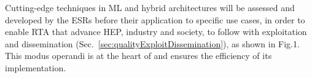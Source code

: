 
Cutting-edge techniques in ML and hybrid architectures will be assessed and developed by the ESRs before their application to specific use cases, in order to enable RTA that advance HEP, industry and society, to follow with exploitation and dissemination (Sec.~\ref{sec:qualityExploitDissemination}), as shown in Fig.1. 
This modus operandi is at the heart of \acronym and ensures the efficiency of its implementation. 


%


